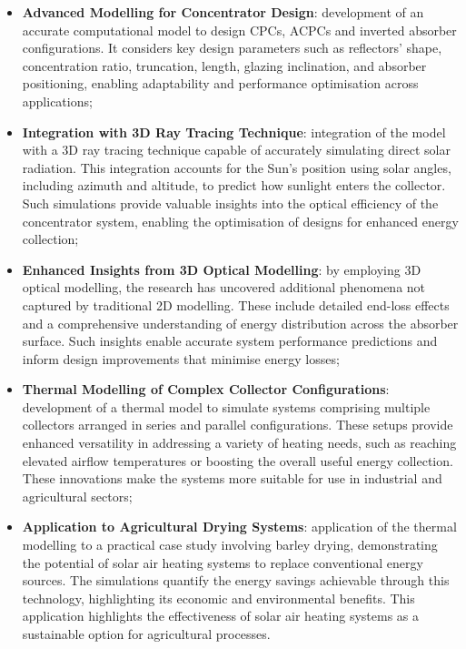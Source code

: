 \begin{itemize}
	\item \textbf{Advanced Modelling for Concentrator Design}:	development of an accurate computational model to design CPCs, ACPCs and inverted absorber configurations. It considers key design parameters such as reflectors' shape, concentration ratio, truncation, length, glazing inclination, and absorber positioning, enabling adaptability and performance optimisation across applications;
	
	\item \textbf{Integration with 3D Ray Tracing Technique}: integration of the model with a 3D ray tracing technique capable of accurately simulating direct solar radiation. This integration accounts for the Sun’s position using solar angles, including azimuth and altitude, to predict how sunlight enters the collector. Such simulations provide valuable insights into the optical efficiency of the concentrator system, enabling the optimisation of designs for enhanced energy collection;
	
	\item \textbf{Enhanced Insights from 3D Optical Modelling}: by employing 3D optical modelling, the research has uncovered additional phenomena not captured by traditional 2D modelling. These include detailed end-loss effects and a comprehensive understanding of energy distribution across the absorber surface. Such insights enable accurate system performance predictions and inform design improvements that minimise energy losses;
	
	\item \textbf{Thermal Modelling of Complex Collector Configurations}: development of a thermal model to simulate systems comprising multiple collectors arranged in series and parallel configurations. These setups provide enhanced versatility in addressing a variety of heating needs, such as reaching elevated airflow temperatures or boosting the overall useful energy collection. These innovations make the systems more suitable for use in industrial and agricultural sectors;
	
	\item \textbf{Application to Agricultural Drying Systems}: application of the thermal modelling to a practical case study involving barley drying, demonstrating the potential of solar air heating systems to replace conventional energy sources. The simulations quantify the energy savings achievable through this technology, highlighting its economic and environmental benefits. This application highlights the effectiveness of solar air heating systems as a sustainable option for agricultural processes.
\end{itemize}

